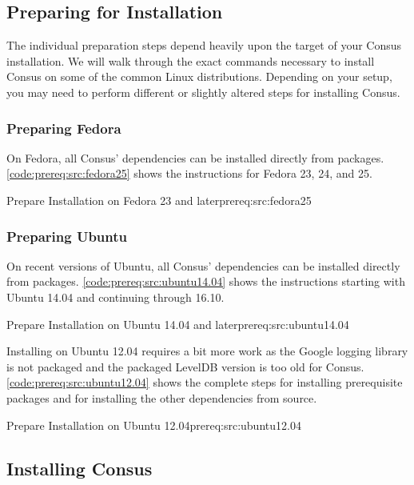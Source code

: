 \subsection{Preparing for Installation}

The individual preparation steps depend heavily upon the target of your Consus
installation.  We will walk through the exact commands necessary to install
Consus on some of the common Linux distributions.  Depending on your setup, you
may need to perform different or slightly altered steps for installing Consus.

\subsubsection*{Preparing Fedora}

On Fedora, all Consus' dependencies can be installed directly from packages.
\cref{code:prereq:src:fedora25} shows the instructions for Fedora 23, 24, and
25.

%
{Prepare Installation on Fedora 23 and later}{prereq:src:fedora25}

\subsubsection*{Preparing Ubuntu}

On recent versions of Ubuntu, all Consus' dependencies can be installed directly
from packages.  \cref{code:prereq:src:ubuntu14.04} shows the instructions
starting with Ubuntu 14.04 and continuing through 16.10.

%
{Prepare Installation on Ubuntu 14.04 and later}{prereq:src:ubuntu14.04}

Installing on Ubuntu 12.04 requires a bit more work as the Google logging
library is not packaged and the packaged LevelDB version is too old for Consus.
\cref{code:prereq:src:ubuntu12.04} shows the complete steps for installing
prerequisite packages and for installing the other dependencies from source.

%
{Prepare Installation on Ubuntu 12.04}{prereq:src:ubuntu12.04}

\subsection{Installing Consus}

